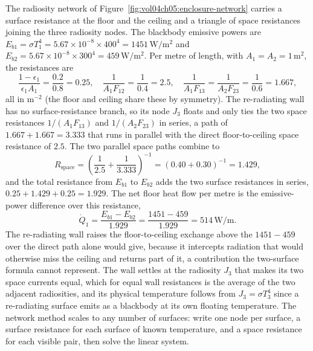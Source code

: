 The radiosity network of Figure~\ref{fig:vol04ch05:enclosure-network}
carries a surface resistance at the floor and the ceiling and a triangle
of space resistances joining the three radiosity nodes. The blackbody
emissive powers are $E_{b1} = \sigma T_1^4 = 5.67\times10^{-8} \times
400^4 = 1451\,\text{W}/\text{m}^2$ and $E_{b2} = 5.67\times10^{-8}
\times 300^4 = 459\,\text{W}/\text{m}^2$. Per metre of length, with
$A_1 = A_2 = 1\,\text{m}^2$, the resistances are
\[
\frac{1-\epsilon_1}{\epsilon_1 A_1} = \frac{0.2}{0.8} = 0.25, \quad
\frac{1}{A_1 F_{12}} = \frac{1}{0.4} = 2.5, \quad \frac{1}{A_1 F_{13}}
= \frac{1}{A_2 F_{23}} = \frac{1}{0.6} = 1.667,
\]
all in $\text{m}^{-2}$ (the floor and ceiling share these by symmetry).
The re-radiating wall has no surface-resistance branch, so its node
$J_3$ floats and only ties the two space resistances $1/(A_1 F_{13})$ and
$1/(A_2 F_{23})$ in series, a path of $1.667 + 1.667 = 3.333$ that runs in
parallel with the direct floor-to-ceiling space resistance of $2.5$. The
two parallel space paths combine to
\[
R_{\text{space}} = \left(\frac{1}{2.5} + \frac{1}{3.333}\right)^{-1} =
(0.40 + 0.30)^{-1} = 1.429,
\]
and the total resistance from $E_{b1}$ to $E_{b2}$ adds the two surface
resistances in series, $0.25 + 1.429 + 0.25 = 1.929$. The net floor heat
flow per metre is the emissive-power difference over this resistance,
\[
\dot{Q}_1 = \frac{E_{b1} - E_{b2}}{1.929} = \frac{1451 - 459}{1.929} =
514\,\text{W}/\text{m}.
\]
The re-radiating wall raises the floor-to-ceiling exchange above the
$1451-459$ over the direct path alone would give, because it intercepts
radiation that would otherwise miss the ceiling and returns part of it,
a contribution the two-surface formula cannot represent. The wall settles
at the radiosity $J_3$ that makes its two space currents equal, which for
equal wall resistances is the average of the two adjacent radiosities, and
its physical temperature follows from $J_3 = \sigma T_3^4$ since a
re-radiating surface emits as a blackbody at its own floating temperature.
The network method scales to any number of surfaces: write one node per
surface, a surface resistance for each surface of known temperature, and a
space resistance for each visible pair, then solve the linear system.



